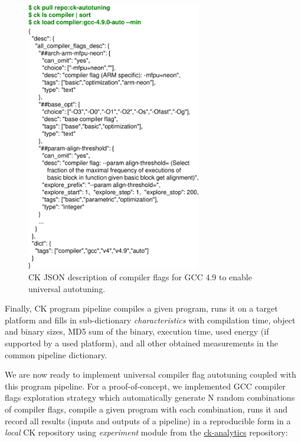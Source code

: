    \begin{figure}[]
     \centering
      \includegraphics[width=3.0in]
      {ck-assets/84964b0640173783-cropped.pdf} %
     \caption{
       CK JSON description of compiler flags for GCC 4.9 to enable universal autotuning.
     }
     \label{fig:ck-gcc-meta}
   \end{figure}

Finally, CK program pipeline compiles a given program, runs it on a target platform
and fills in sub-dictionary \textit{characteristics} 
with compilation time, object and binary sizes, MD5 sum of the binary, execution time,
used energy (if supported by a used platform), and all other obtained measurements
in the common pipeline dictionary.

We are now ready to implement universal compiler flag autotuning coupled with
this program pipeline.
%
For a proof-of-concept, we implemented GCC compiler flags exploration strategy
which automatically generate N random combinations of compiler flags, 
compile a given program with each combination, runs it and record all results 
(inputs and outputs of a pipeline) in a reproducible form in a \textit{local} 
CK repository using \textit{experiment} module from 
the \href{https://github.com/ctuning/ck-analytics}{ck-analytics} 
repository:

